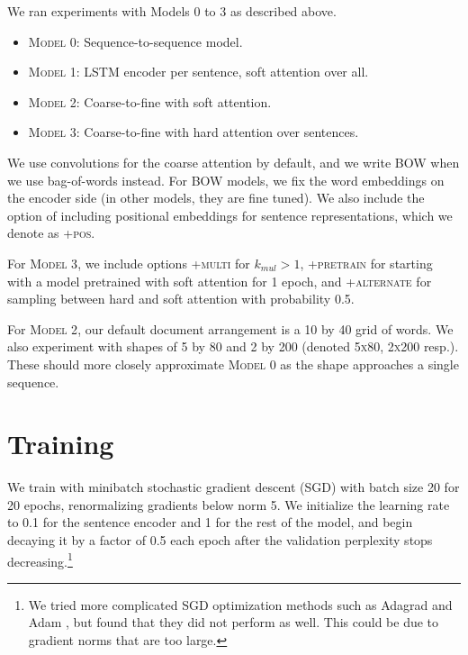 \documentclass[12pt]{report}
\begin{document}
We ran experiments with Models 0 to 3 as described above.

\begin{itemize}
\item \textsc{Model 0}: Sequence-to-sequence model.
\item \textsc{Model 1}: LSTM encoder per sentence, soft attention over all.
\item \textsc{Model 2}: Coarse-to-fine with soft attention.
\item \textsc{Model 3}: Coarse-to-fine with hard attention over sentences.
\end{itemize}

We use convolutions for the coarse attention by default, and we write \textsc{BOW} when we use bag-of-words instead. For \textsc{BOW} models, we fix the word embeddings on the encoder side (in other models, they are fine tuned). We also include the option of including positional embeddings for sentence representations, which we denote as \textsc{+pos}.

For \textsc{Model 3}, we include options \textsc{+multi} for $k_{mul} > 1$, \textsc{+pretrain} for starting with a model pretrained with soft attention for 1 epoch, and \textsc{+alternate} for sampling between hard and soft attention with probability 0.5.

For \textsc{Model 2}, our default document arrangement is a 10 by 40 grid of words. We also experiment with shapes of 5 by 80 and 2 by 200 (denoted \textsc{5x80}, \textsc{2x200} resp.). These should more closely approximate \textsc{Model 0} as the shape approaches a single sequence.


\section{Training}

We train with minibatch stochastic gradient descent (SGD) with batch size 20 for 20 epochs, renormalizing gradients below norm 5. We initialize the learning rate to 0.1 for the sentence encoder and 1 for the rest of the model, and begin decaying it by a factor of 0.5 each epoch after the validation perplexity stops decreasing.\footnote{We tried more complicated SGD optimization methods such as Adagrad \citep{Duchi2011} and Adam \citep{Kingma2015}, but found that they did not perform as well. This could be due to gradient norms that are too large.}
\end{document}
